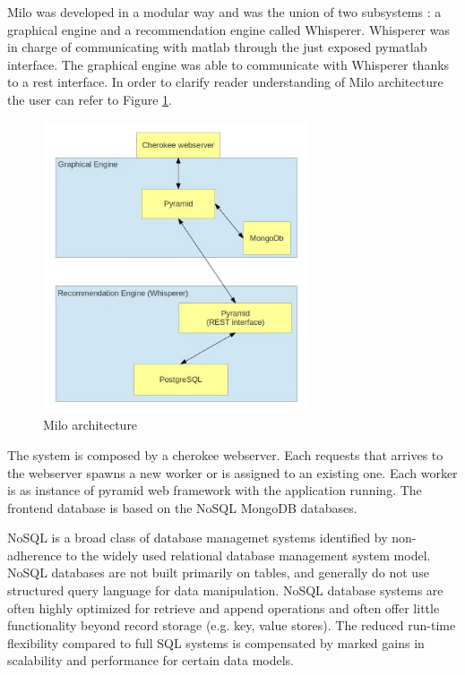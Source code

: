 Milo was developed in a modular way and was the union of two subsystems \cite{thesis-andreia}: a graphical engine and a recommendation engine called Whisperer. Whisperer was in charge of communicating with matlab through the just exposed pymatlab interface. The graphical engine was able to communicate with Whisperer thanks to a rest interface. In order to clarify reader understanding of Milo architecture the user can refer to Figure \ref{fig:milo_architecture}.

\begin{figure}
  \centering
  \includegraphics[width=0.7\textwidth]{figures/milo_architecture.jpg}
  \caption{Milo architecture}
  \label{fig:milo_architecture}
\end{figure}

The system is composed by a cherokee webserver. Each requests that arrives to the webserver spawns a new worker or is assigned to an existing one. Each worker is as instance of pyramid web framework with the application running. The frontend database is based on the NoSQL \cite{nosql} MongoDB \cite{mongodb} databases.

NoSQL is a broad class of database managemet systems identified by non-adherence to the widely used relational database management system model. NoSQL databases are not built primarily on tables, and generally do not use structured query language for data manipulation. NoSQL database systems are often highly optimized for retrieve and append operations and often offer little functionality beyond record storage (e.g. key, value stores). The reduced run-time flexibility compared to full SQL systems is compensated by marked gains in scalability and performance for certain data models. 

